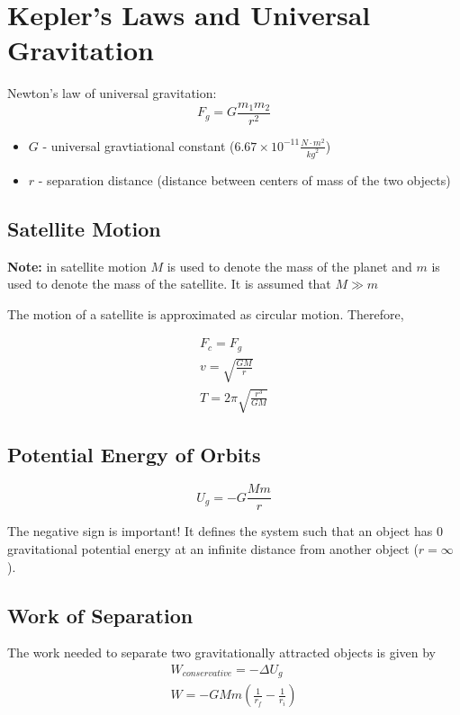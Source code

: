 \documentclass[titlepage]{article}
\begin{document}
\section{Kepler's Laws and Universal Gravitation}
Newton's law of universal gravitation:
\begin{equation*}
    F_g = G\frac{m_1 m_2}{r^2}
\end{equation*}

\begin{itemize}
    \item $G$ - universal gravtiational constant ($6.67 \times 10^{-11} \frac{N \cdot m^2}{{kg}^2}$)
    \item $r$ - separation distance (distance between centers of mass of the two objects)
\end{itemize}

\subsection{Satellite Motion}
\textbf{Note:} in satellite motion $M$ is used to denote the mass of the planet and $m$ is used to denote the mass of the satellite. It is assumed that $M \gg m$

The motion of a satellite is approximated as circular motion. Therefore,

\begin{align*}
    F_c = F_g \\
    v = \sqrt{\frac{GM}{r}} \\
    T = 2 \pi \sqrt{\frac{r^3}{GM}}
\end{align*}

\subsection{Potential Energy of Orbits}
\begin{equation*}
    U_g = -G \frac{Mm}{r}
\end{equation*}

The negative sign is important! It defines the system such that an object has 0 gravitational potential energy at an infinite distance from another object ($r = \infty$).

\subsection{Work of Separation}
The work needed to separate two gravitationally attracted objects is given by
\begin{align*}
    W_{conservative} = -\Delta U_g \\
    W = -GMm \left( \frac{1}{r_f} - \frac{1}{r_i} \right)
\end{align*}
\end{document}
